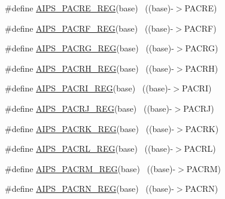 \begin{DoxyCompactItemize}
\item 
\#define \hyperlink{group___a_i_p_s___register___accessor___macros_ga0ffe27f782cfd17219262c14978ba385}{A\+I\+P\+S\+\_\+\+P\+A\+C\+R\+E\+\_\+\+R\+EG}(base)                                      ~((base)-\/$>$P\+A\+C\+RE)
\item 
\#define \hyperlink{group___a_i_p_s___register___accessor___macros_ga01a04977f704838f7aecf35adfaaa5f6}{A\+I\+P\+S\+\_\+\+P\+A\+C\+R\+F\+\_\+\+R\+EG}(base)                                      ~((base)-\/$>$P\+A\+C\+RF)
\item 
\#define \hyperlink{group___a_i_p_s___register___accessor___macros_ga3dfe3bc1cba527813e4c6e8edb0754c8}{A\+I\+P\+S\+\_\+\+P\+A\+C\+R\+G\+\_\+\+R\+EG}(base)                                      ~((base)-\/$>$P\+A\+C\+RG)
\item 
\#define \hyperlink{group___a_i_p_s___register___accessor___macros_ga70fe12499dcff4c1cd86c407b7243603}{A\+I\+P\+S\+\_\+\+P\+A\+C\+R\+H\+\_\+\+R\+EG}(base)                                      ~((base)-\/$>$P\+A\+C\+RH)
\item 
\#define \hyperlink{group___a_i_p_s___register___accessor___macros_gae8f9e75bc6e77812a3e9814ef3edd1f7}{A\+I\+P\+S\+\_\+\+P\+A\+C\+R\+I\+\_\+\+R\+EG}(base)                                      ~((base)-\/$>$P\+A\+C\+RI)
\item 
\#define \hyperlink{group___a_i_p_s___register___accessor___macros_ga0d8e502845b69ce0b8dbfd16b115ee78}{A\+I\+P\+S\+\_\+\+P\+A\+C\+R\+J\+\_\+\+R\+EG}(base)                                      ~((base)-\/$>$P\+A\+C\+RJ)
\item 
\#define \hyperlink{group___a_i_p_s___register___accessor___macros_gad254171eacb0d0003ba2f458d3627682}{A\+I\+P\+S\+\_\+\+P\+A\+C\+R\+K\+\_\+\+R\+EG}(base)                                      ~((base)-\/$>$P\+A\+C\+RK)
\item 
\#define \hyperlink{group___a_i_p_s___register___accessor___macros_ga9f0835d43f92a09467da7cae7f5a602f}{A\+I\+P\+S\+\_\+\+P\+A\+C\+R\+L\+\_\+\+R\+EG}(base)                                      ~((base)-\/$>$P\+A\+C\+RL)
\item 
\#define \hyperlink{group___a_i_p_s___register___accessor___macros_ga85c559319333d83c01a7dcea1ac14bad}{A\+I\+P\+S\+\_\+\+P\+A\+C\+R\+M\+\_\+\+R\+EG}(base)                                      ~((base)-\/$>$P\+A\+C\+RM)
\item 
\#define \hyperlink{group___a_i_p_s___register___accessor___macros_gaa794b17b9de6a81bd01fc3bdeeafc5b2}{A\+I\+P\+S\+\_\+\+P\+A\+C\+R\+N\+\_\+\+R\+EG}(base)                                      ~((base)-\/$>$P\+A\+C\+RN)

\end{DoxyCompactItemize}
